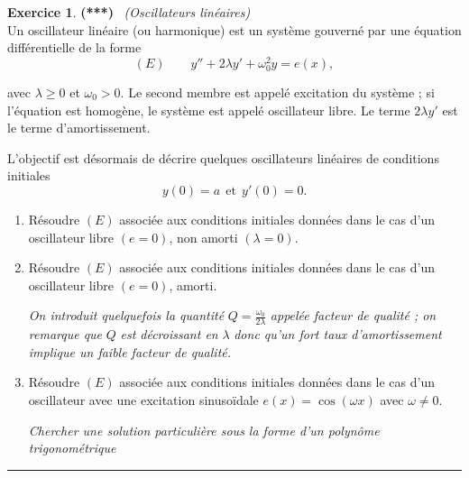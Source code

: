 \documentclass[a4paper,11pt]{article}
\theoremstyle{definition}
\newtheorem{exo}{Exercice} %
\begin{document}
		\begin{exo}\textbf{(***)} \ \textit{(Oscillateurs linéaires)}\quad\\[0.2cm]
			Un oscillateur linéaire (ou harmonique) est un système gouverné par une équation diﬀérentielle de la
			forme
			$$ (E) \quad \quad y'' + 2\lambda y' + \omega_0^2 y = e(x ),$$
			
			avec $\lambda \geq 0$ et $\omega_0 > 0$. Le second membre est appelé excitation du système ; si l’équation est homogène, le système est appelé oscillateur libre. Le terme $2\lambda y'$ est le terme d’amortissement.
			
			L’objectif est désormais de décrire quelques oscillateurs linéaires de conditions initiales
			$$y (0) = a
			\ \ \text{et} \ \ 
			y'(0) = 0.$$
			\begin{enumerate}
				\item Résoudre $(E)$ associée aux conditions initiales données dans le cas d'un oscillateur libre $(e = 0)$, non amorti $(\lambda = 0)$.
				\item Résoudre $(E)$ associée aux conditions initiales données dans le cas d'un oscillateur libre $(e = 0)$, amorti.
				
				\textit{On introduit quelquefois la quantité} $Q = \frac{\omega_0}{2\lambda}$ \textit{appelée facteur de qualité ; on remarque que} $Q$ \textit{est décroissant en} $\lambda$ \textit{donc qu’un fort taux d’amortissement implique un faible facteur de qualité.}
				
				\item Résoudre $(E)$ associée aux conditions initiales données dans le cas d'un oscillateur avec une excitation sinusoïdale $e (x ) = \cos(\omega x )$ avec $\omega \neq 0$.
				
				 \textit{Chercher une solution particulière sous la forme d’un polynôme trigonométrique}
			\end{enumerate}
			
			
			\centering
			\rule{1\linewidth}{0.6pt}
		\end{exo}
		
		
\end{document}
